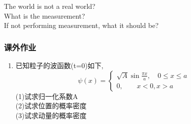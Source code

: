 \begin{frame}
    \frametitle{}
    \centering
    {
      \large  {The world is not a real world?\\
      What is the measurement? \\
      If not performing measurement, what it should be?}
    }
\end{frame}

 \begin{frame}
    \frametitle{课外作业}
    \begin{enumerate}
       \item 已知粒子的波函数(t=0)如下,
       \[\psi(x) = \begin{cases}
             \sqrt{A}\sin \frac{\pi x}{a}, \quad 0\leq x\leq a\\
             0, \qquad  x<0, x>a
           \end{cases}\]
               (1)试求归一化系数A \\
               (2)试求位置的概率密度 \\
               (3)试求动量的概率密度
    \end{enumerate}
\end{frame}
